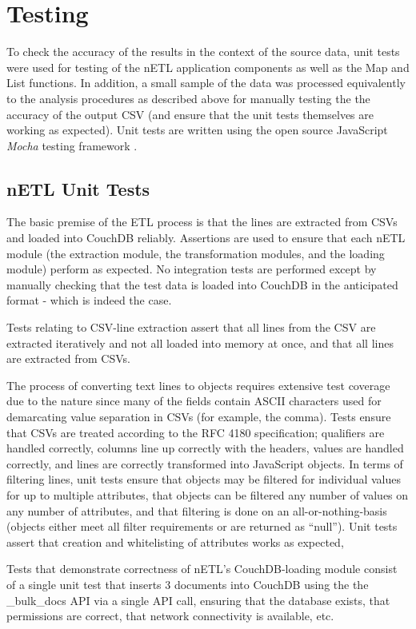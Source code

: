\section{Testing}
To check the accuracy of the results in the context of the source data, unit tests were used for testing of the nETL application components as well as the Map and List functions. In addition, a small sample of the data was processed equivalently to the analysis procedures as described above for manually testing the the accuracy of the output CSV (and ensure that the unit tests themselves are working as expected). Unit tests are written using the open source JavaScript \textit{Mocha} testing framework \cite{mochaTest}.

\subsection{nETL Unit Tests}
The basic premise of the ETL process is that the lines are extracted from CSVs and loaded into CouchDB reliably. Assertions are used to ensure that each nETL module (the extraction module, the transformation modules, and the loading module) perform as expected. No integration tests are performed except by manually checking that the test data is loaded into CouchDB in the anticipated format - which is indeed the case.

Tests relating to CSV-line extraction assert that all lines from the CSV are extracted iteratively and not all loaded into memory at once, and that all lines are extracted from CSVs.

The process of converting text lines to objects requires extensive test coverage due to the nature since many of the fields contain ASCII characters used for demarcating value separation in CSVs (for example, the comma). Tests ensure that CSVs are treated according to the RFC 4180 specification; qualifiers are handled correctly, columns line up correctly with the headers, values are handled correctly, and lines are correctly transformed into JavaScript objects. In terms of filtering lines, unit tests ensure that objects may be filtered for individual values for up to multiple attributes, that objects can be filtered any number of values on any number of attributes, and that filtering is done on an all-or-nothing-basis (objects either meet all filter requirements or are returned as ``null''). Unit tests assert that creation and whitelisting of attributes works as expected,

Tests that demonstrate correctness of nETL's CouchDB-loading module consist of a single unit test that inserts 3 documents into CouchDB using the the \_bulk\_docs API via a single API call, ensuring that the database exists, that permissions are correct, that network connectivity is available, etc.

